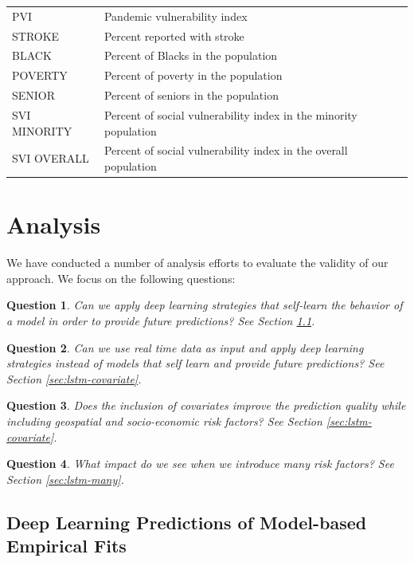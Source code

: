 \documentclass[letterpaper, inpress]{jds} %
\renewcommand{\_}{%
    \textunderscore\hspace{0pt}%
}
\newtheorem{question}{Question}
\begin{document}
\begin{table}[!hptb]
{\begin{tabular}{ll}
 PVI 		  & Pandemic vulnerability index \\
 STROKE 	  & Percent reported with stroke\\
 BLACK	  & Percent of Blacks in the population\\
 POVERTY & Percent of poverty in the population\\
 SENIOR  & Percent of seniors in the population\\
 SVI\_MINORITY 	  & Percent of social vulnerability index in the minority population\\
 SVI\_OVERALL 	  & Percent of social vulnerability index in the overall population\\
\bottomrule
\end{tabular}
}
\end{table}


\section{Analysis}

We have conducted a number of analysis efforts to evaluate the validity of our approach. We focus on the following questions:

\begin{question} \normalfont Can we apply deep learning strategies that self-learn the behavior of a model in order to provide future predictions? See Section \ref{sec:emperical}.
\label{q:1}
\end{question}

\begin{question} \normalfont Can we use real time data as input and apply deep learning strategies instead of models that self learn and provide future predictions? See Section \ref{sec:lstm-covariate}.
\label{q:2}
\end{question}

\begin{question} \normalfont Does the inclusion of covariates improve the prediction quality while including geospatial and socio-economic risk factors? See Section \ref{sec:lstm-covariate}.
\label{q:3}
\end{question}

\begin{question} \normalfont What impact do we see when we introduce many risk factors? See Section \ref{sec:lstm-many}.
\label{q:4}
\end{question}

\subsection{Deep Learning Predictions of Model-based Empirical Fits} 
\label{sec:emperical}
\end{document}
